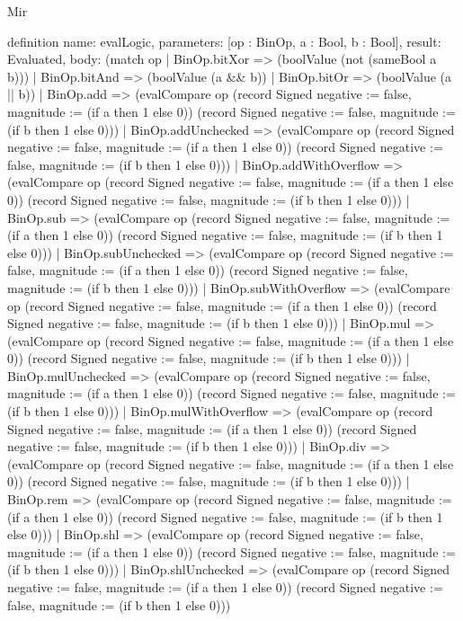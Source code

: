\begin{lexlean}{Mir}
\begin{semanticmodule}
definition{
  name: evalLogic,
  parameters: [op : BinOp, a : Bool, b : Bool],
  result: Evaluated,
  body: (match op
    | BinOp.bitXor => (boolValue (not (sameBool a b)))
    | BinOp.bitAnd => (boolValue (a && b))
    | BinOp.bitOr => (boolValue (a || b))
    | BinOp.add => (evalCompare op (record Signed {negative := false, magnitude := (if a then 1 else 0)}) (record Signed {negative := false, magnitude := (if b then 1 else 0)}))
    | BinOp.addUnchecked => (evalCompare op (record Signed {negative := false, magnitude := (if a then 1 else 0)}) (record Signed {negative := false, magnitude := (if b then 1 else 0)}))
    | BinOp.addWithOverflow => (evalCompare op (record Signed {negative := false, magnitude := (if a then 1 else 0)}) (record Signed {negative := false, magnitude := (if b then 1 else 0)}))
    | BinOp.sub => (evalCompare op (record Signed {negative := false, magnitude := (if a then 1 else 0)}) (record Signed {negative := false, magnitude := (if b then 1 else 0)}))
    | BinOp.subUnchecked => (evalCompare op (record Signed {negative := false, magnitude := (if a then 1 else 0)}) (record Signed {negative := false, magnitude := (if b then 1 else 0)}))
    | BinOp.subWithOverflow => (evalCompare op (record Signed {negative := false, magnitude := (if a then 1 else 0)}) (record Signed {negative := false, magnitude := (if b then 1 else 0)}))
    | BinOp.mul => (evalCompare op (record Signed {negative := false, magnitude := (if a then 1 else 0)}) (record Signed {negative := false, magnitude := (if b then 1 else 0)}))
    | BinOp.mulUnchecked => (evalCompare op (record Signed {negative := false, magnitude := (if a then 1 else 0)}) (record Signed {negative := false, magnitude := (if b then 1 else 0)}))
    | BinOp.mulWithOverflow => (evalCompare op (record Signed {negative := false, magnitude := (if a then 1 else 0)}) (record Signed {negative := false, magnitude := (if b then 1 else 0)}))
    | BinOp.div => (evalCompare op (record Signed {negative := false, magnitude := (if a then 1 else 0)}) (record Signed {negative := false, magnitude := (if b then 1 else 0)}))
    | BinOp.rem => (evalCompare op (record Signed {negative := false, magnitude := (if a then 1 else 0)}) (record Signed {negative := false, magnitude := (if b then 1 else 0)}))
    | BinOp.shl => (evalCompare op (record Signed {negative := false, magnitude := (if a then 1 else 0)}) (record Signed {negative := false, magnitude := (if b then 1 else 0)}))
    | BinOp.shlUnchecked => (evalCompare op (record Signed {negative := false, magnitude := (if a then 1 else 0)}) (record Signed {negative := false, magnitude := (if b then 1 else 0)}))
}
\end{semanticmodule}
\end{lexlean}
